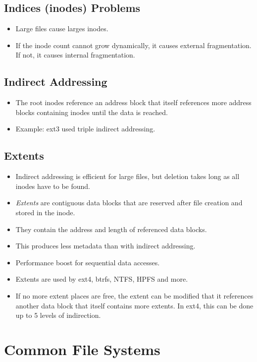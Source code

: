 	\subsection{Indices (inodes) Problems}
		\begin{itemize}
			\item Large files cause larges inodes.
			\item If the inode count cannot grow dynamically, it causes external fragmentation. If not, it causes internal fragmentation.
		\end{itemize}

	\subsection{Indirect Addressing}
		\begin{itemize}
			\item The root inodes reference an address block that itself references more address blocks containing inodes until the data is reached.
			\item Example: ext3 used triple indirect addressing.
		\end{itemize}

	\subsection{Extents}
		\begin{itemize}
			\item Indirect addressing is efficient for large files, but deletion takes long as all inodes have to be found.
			\item \textit{Extents} are contiguous data blocks that are reserved after file creation and stored in the inode.
			\item They contain the address and length of referenced data blocks.
			\item This produces less metadata than with indirect addressing.
			\item Performance boost for sequential data accesses.
			\item Extents are used by ext4, btrfs, NTFS, HPFS and more.
			\item If no more extent places are free, the extent can be modified that it references another data block that itself contains more extents. In ext4, this can be done up to 5 levels of indirection.
		\end{itemize}

\section{Common File Systems}
